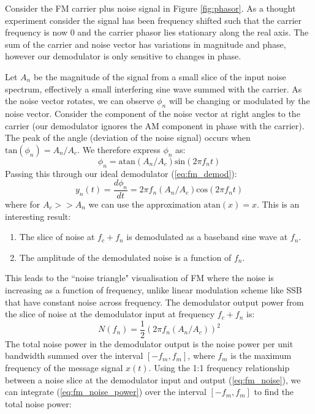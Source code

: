 \documentclass{article}
\begin{document}
Consider the FM carrier plus noise signal in Figure \ref{fig:phasor}.  As a thought experiment consider the signal has been frequency shifted such that the carrier frequency is now 0 and the carrier phasor lies stationary along the real axis.  The sum of the carrier and noise vector has variations in magnitude and phase, however our demodulator is only sensitive to changes in phase. 

Let $A_n$ be the magnitude of the signal from a small slice of the input noise spectrum, effectively a small interfering sine wave summed with the carrier. As the noise vector rotates, we can observe $\phi_n$ will be changing or modulated by the noise vector. Consider the component of the noise vector at right angles to the carrier (our demodulator ignores the AM component in phase with the carrier). The peak of the angle (deviation of the noise signal) occurs when $\mathrm{tan}(\phi_n) = A_n/A_c$.  We therefore express $\phi_n$ as:
\begin{equation}
\phi_n = \mathrm{atan}(A_n/A_c)\mathrm{sin}(2 \pi f_n t)
\end{equation}
Passing this through our ideal demodulator (\ref{eq:fm_demod}):
\begin{equation}
y_n(t) = \frac{d\phi_n}{dt} =  2 \pi f_n (A_n/A_c) \mathrm{cos}(2 \pi f_n t)
\end{equation}
where for $A_c>>A_n$ we can use the approximation $\mathrm{atan}(x)=x$.
This is an interesting result:
\begin{enumerate}
\item The slice of noise at $f_c+f_n$ is demodulated as a baseband sine wave at $f_n$.
\item The amplitude of the demodulated noise is a function of $f_n$.
\end{enumerate}
This leads to the ``noise triangle" visualisation of FM where the noise is increasing as a function of frequency, unlike linear modulation scheme like SSB that have constant noise across frequency. The demodulator output power from the slice of noise at the demodulator input at frequency $f_c+f_n$ is:
\begin{equation}
\label{eq:fm_noise_power}
N(f_n) =  \frac{1}{2}(2 \pi f_n (A_n/A_c) )^2 
\end{equation}
The total noise power in the demodulator output is the noise power per unit bandwidth summed over the interval $[-f_m,f_m]$, where $f_m$ is the maximum frequency of the message signal $x(t)$. Using the 1:1 frequency relationship between a noise slice at the demodulator input and output (\ref{eq:fm_noise}), we can integrate (\ref{eq:fm_noise_power}) over the interval $[-f_m,f_m]$ to find the total noise power:
\end{document}
